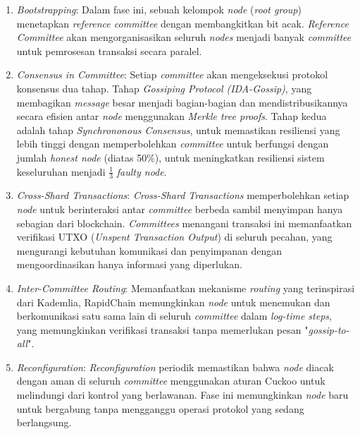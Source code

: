 \begin{enumerate}
	\item \textit{Bootstrapping}: Dalam fase ini, sebuah kelompok \textit{node} (\textit{root group}) menetapkan \textit{reference committee} dengan membangkitkan bit acak. \textit{Reference Committee} akan mengorganisasikan seluruh \textit{nodes} menjadi banyak \textit{committee} untuk pemrosesan transaksi secara paralel.
	\item \textit{Consensus in Committee}: Setiap \textit{committee} akan mengeksekusi protokol konsensus dua tahap. Tahap \textit{Gossiping Protocol (IDA-Gossip)}, yang membagikan \textit{message} besar menjadi bagian-bagian dan mendistribusikannya secara efisien antar \textit{node} menggunakan \textit{Merkle tree proofs}. Tahap kedua adalah tahap \textit{Synchrononous Consensus}, untuk memastikan resiliensi yang lebih tinggi dengan memperbolehkan \textit{committee} untuk berfungsi dengan jumlah \textit{honest node} (diatas 50\%), untuk meningkatkan resiliensi sistem keseluruhan menjadi $\frac{1}{3}$ \textit{faulty node}.
	\item \textit{Cross-Shard Transactions}: \textit{Cross-Shard Transactions} memperbolehkan setiap \textit{node} untuk berinteraksi antar \textit{committee} berbeda sambil menyimpan hanya sebagian dari blockchain. \textit{Committees} menangani transaksi ini memanfaatkan verifikasi UTXO (\textit{Unspent Transaction Output}) di seluruh pecahan, yang mengurangi kebutuhan komunikasi dan penyimpanan dengan mengoordinasikan hanya informasi yang diperlukan.
	\item \textit{Inter-Committee Routing}: Memanfaatkan mekanisme \textit{routing} yang terinspirasi dari Kademlia, RapidChain memungkinkan \textit{node} untuk menemukan dan berkomunikasi satu sama lain di seluruh \textit{committee} dalam \textit{log-time steps}, yang memungkinkan verifikasi transaksi tanpa memerlukan pesan "\textit{gossip-to-all}".
	\item \textit{Reconfiguration}: \textit{Reconfiguration} periodik memastikan bahwa \textit{node} diacak dengan aman di seluruh \textit{committee} menggunakan aturan Cuckoo untuk melindungi dari kontrol yang berlawanan. Fase ini memungkinkan \textit{node} baru untuk bergabung tanpa mengganggu operasi protokol yang sedang berlangsung.
\end{enumerate}